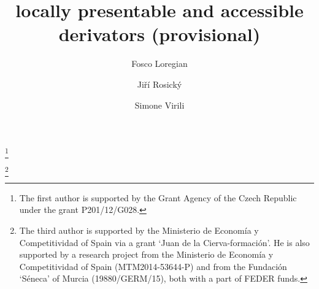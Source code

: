 
\title{locally presentable and accessible derivators (provisional)}

\author{Fosco Loregian}
\address{%
\textsf{Fosco Loregian}: \newline
Department of Mathematics and Statistics             \newline
Masaryk University, Faculty of Sciences              \newline
Kotl\'{a}\v{r}sk\'{a} 2, 611 37 Brno, Czech Republic \newline
{}}
\thanks{The first author is supported by the Grant Agency of the 
        Czech Republic under the grant \textsc{P}201/12/\textsc{G}028.}


\author[Ji\v{r}\'i Rosick\'{y}]{Ji\v{r}\'i Rosick\'{y}}
\address{
\textsf{J. Rosick\'{y}}: \newline
Department of Mathematics and Statistics             \newline
Masaryk University, Faculty of Sciences              \newline
Kotl\'{a}\v{r}sk\'{a} 2, 611 37 Brno, Czech Republic \newline
{}}


\author[Simone Virili]{Simone Virili}
\address{
\textsf{Simone Virili}: \newline
Facultad de Matem\'aticas, Universidad de Murcia \newline
Campus Espinardo, , Murcia.  \newline
{}}

\thanks{The third author is supported by the Ministerio de Econom\'ia y Competitividad of Spain via a grant 
`Juan de la Cierva-formaci\'on'. He is also supported by a research project from the Ministerio de Econom\'ia y Competitividad of Spain
(MTM2014-53644-P) and from the Fundaci\'on `S\'eneca' of Murcia (19880/GERM/15), both with a part of FEDER funds.}

\subjclass[2010]{}
